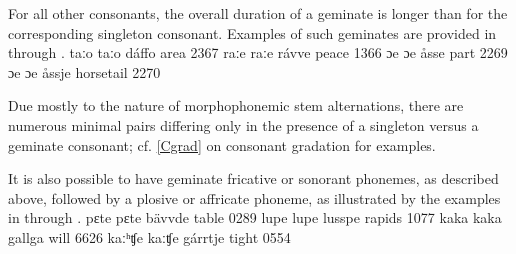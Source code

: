For all other consonants, the overall duration of a geminate is longer than for the corresponding singleton consonant. Examples of such geminates are provided in  through .
	{taːo}	{taːo}	{dáffo}	{area\BS{}}		{2367}%
	{raːe}	{raːe}	{rávve}	{peace\BS{}}		{1366}%
	{ɔe}	{ɔe}	{åsse}	{part\BS{}}	{2269}
	{ɔe}	{ɔe}	{åssje}	{horsetail\BS{}}	{2270}

Due mostly to the nature of morphophonemic stem alternations, there are numerous minimal pairs differing only in the presence of a singleton versus a geminate consonant; cf. \SEC\ref{Cgrad} on consonant gradation for examples. %

It is also possible to have geminate fricative or sonorant phonemes, as described above, followed by a plosive or affricate phoneme, as illustrated by the examples in  through .
	{pɛte}	{pɛte}	{bävvde}	{table\BS{}}		{0289}%
	{lupe}	{lupe}	{lusspe}	{rapids\BS{}}		{1077}%
	{kaka}	{kaka}	{gallga}	{will\BS{}}		{6626}%
	{kaːʰʧe}	{kaːʧe}	{gárrtje}	{tight\BS{}}		{0554}%

